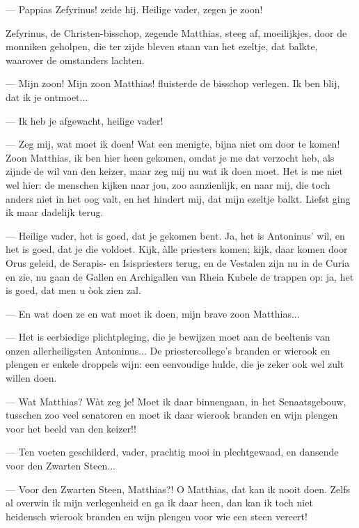 \documentclass[a4paper, 12pt, oneside, dutch]{article}
\begin{document}
--- Pappias Zefyrinus! zeide hij. Heilige vader, zegen je zoon!

Zefyrinus, de Christen-bisschop, zegende Matthias, steeg af, moeilijkjes, door de monniken geholpen, die ter zijde bleven staan van het ezeltje, dat balkte, waarover de omstanders lachten.

--- Mijn zoon! Mijn zoon Matthias! fluisterde de bisschop verlegen. Ik ben blij, dat ik je ontmoet...

--- Ik heb je afgewacht, heilige vader!

--- Zeg mij, wat moet ik doen! Wat een menigte, bijna niet om door te komen! Zoon Matthias, ik ben hier heen gekomen, omdat je me dat verzocht heb, als zijnde de wil van den keizer, maar zeg mij nu wat ik doen moet. Het is me niet wel hier: de menschen kijken naar jou, zoo aanzienlijk, en naar mij, die toch anders niet in het oog valt, en het hindert mij, dat mijn ezeltje balkt. Liefst ging ik maar dadelijk terug.

--- Heilige vader, het is goed, dat je gekomen bent. Ja, het is Antoninus' wil, en het is goed, dat je die voldoet. Kijk, àlle priesters komen; kijk, daar komen door Orus geleid, de Serapis- en Isispriesters terug, en de Vestalen zijn nu in de Curia en zie, nu gaan de Gallen en Archigallen van Rheia Kubele de trappen op: ja, het is goed, dat men u òok zien zal.

--- En wat doen ze en wat moet ik doen, mijn brave zoon Matthias...

--- Het is eerbiedige plichtpleging, die je bewijzen moet aan de beeltenis van onzen allerheiligsten Antoninus... De priestercollege's branden er wierook en plengen er enkele droppels wijn: een eenvoudige hulde, die je zeker ook wel zult willen doen.

--- Wat Matthias? Wàt zeg je! Moet ik daar binnengaan, in het Senaatsgebouw, tusschen zoo veel senatoren en moet ik daar wierook branden en wijn plengen voor het beeld van den keizer!!

--- Ten voeten geschilderd, vader, prachtig mooi in plechtgewaad, en dansende voor den Zwarten Steen...

--- Voor den Zwarten Steen, Matthias?! O Matthias, dat kan ik nooit doen. Zelfs al overwin ik mijn verlegenheid en ga ik daar heen, dan kan ik toch niet heidensch wierook branden en wijn plengen voor wie een steen vereert!
\end{document}
